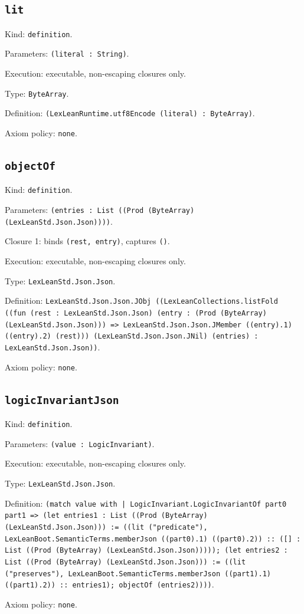 \documentclass[11pt]{article}
\begin{document}
\subsection*{\texttt{lit}}
\noindent Kind: \texttt{definition}.\par
\noindent Parameters: \texttt{(literal : String)}.\par
\noindent Execution: executable, non-escaping closures only.\par
\noindent Type: \texttt{ByteArray}.\par
\noindent Definition: \texttt{(LexLeanRuntime.utf8Encode (literal) : ByteArray)}.\par
\noindent Axiom policy: \texttt{none}.\par
\subsection*{\texttt{objectOf}}
\noindent Kind: \texttt{definition}.\par
\noindent Parameters: \texttt{(entries : List ((Prod (ByteArray) (LexLeanStd.Json.Json))))}.\par
\noindent Closure 1: binds \texttt{(rest, entry)}, captures \texttt{()}.\par
\noindent Execution: executable, non-escaping closures only.\par
\noindent Type: \texttt{LexLeanStd.Json.Json}.\par
\noindent Definition: \texttt{LexLeanStd.Json.Json.JObj ((LexLeanCollections.listFold ((fun (rest : LexLeanStd.Json.Json) (entry : (Prod (ByteArray) (LexLeanStd.Json.Json))) => LexLeanStd.Json.Json.JMember ((entry).1) ((entry).2) (rest))) (LexLeanStd.Json.Json.JNil) (entries) : LexLeanStd.Json.Json))}.\par
\noindent Axiom policy: \texttt{none}.\par
\subsection*{\texttt{logicInvariantJson}}
\noindent Kind: \texttt{definition}.\par
\noindent Parameters: \texttt{(value : LogicInvariant)}.\par
\noindent Execution: executable, non-escaping closures only.\par
\noindent Type: \texttt{LexLeanStd.Json.Json}.\par
\noindent Definition: \texttt{(match value with | LogicInvariant.LogicInvariantOf part0 part1 => (let entries1 : List ((Prod (ByteArray) (LexLeanStd.Json.Json))) := ((lit ("predicate"), LexLeanBoot.SemanticTerms.memberJson ((part0).1) ((part0).2)) :: ([] : List ((Prod (ByteArray) (LexLeanStd.Json.Json))))); (let entries2 : List ((Prod (ByteArray) (LexLeanStd.Json.Json))) := ((lit ("preserves"), LexLeanBoot.SemanticTerms.memberJson ((part1).1) ((part1).2)) :: entries1); objectOf (entries2))))}.\par
\noindent Axiom policy: \texttt{none}.\par
\end{document}
